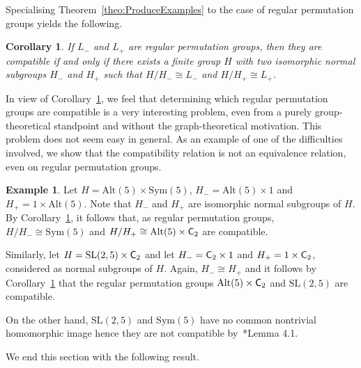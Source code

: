 \documentclass[twoside,12pt,leqno]{amsproc}
\numberwithin{table}{section}
\numberwithin{figure}{section}
\theoremstyle{plain}
\newtheorem{corollary}[theorem]{Corollary}
\theoremstyle{definition}\newtheorem{definition}[theorem]{Definition}
\theoremstyle{definition}\newtheorem{example}[theorem]{Example}
\theoremstyle{definition}\newtheorem{construction}[theorem]{Construction}
\theoremstyle{definition}\newtheorem{remark}[theorem]{Remark}
\theoremstyle{definition}\newtheorem{problem}[theorem]{Problem}
\begin{document}
Specialising Theorem~\ref{theo:ProduceExamples} to the case of regular permutation groups yields the following.

\begin{corollary}\label{cor:ProduceExamples2}
If $L_-$ and $L_+$ are regular permutation groups, then they are compatible if and only if there exists a finite group $H$ with two isomorphic normal subgroups $H_-$ and $H_+$ such that $H/H_-\cong L_-$ and $H/H_+\cong L_+$.
\end{corollary}

In view of Corollary~\ref{cor:ProduceExamples2}, we feel that determining  which regular permutation groups are compatible is a very interesting problem, even from a purely group-theoretical standpoint and without the graph-theoretical motivation. This problem does not seem easy in general. As an example of one of the difficulties involved, we show that the compatibility relation is not an equivalence relation, even on regular permutation groups.

\begin{example}
Let $H={\textrm{Alt}}(5)\times{\mathrm{Sym}}(5)$, $H_-={\textrm{Alt}}(5)\times 1$ and $H_+=1\times{\textrm{Alt}}(5)$. Note that $H_-$ and $H_+$ are isomorphic normal subgroups of $H$. By Corollary~\ref{cor:ProduceExamples2}, it follows that, as regular permutation groups, $H/H_-\cong {\mathrm{Sym}}(5)$ and $H/H_+\cong{\textrm{Alt}}(5)\times{\textup{\textsf{C}}}_2$ are compatible.

Similarly, let $H={\mathrm{SL}}(2,5)\times{\textup{\textsf{C}}}_2$  and let $H_-={\textup{\textsf{C}}}_2\times 1$ and $H_+=1\times{\textup{\textsf{C}}}_2$, considered as normal subgroups of $H$. Again, $H_-\cong H_+$  and it follows by Corollary~\ref{cor:ProduceExamples2} that the regular permutation groups ${\textrm{Alt}}(5)\times{\textup{\textsf{C}}}_2$ and ${\mathrm{SL}}(2,5)$ are compatible.

On the other hand, ${\mathrm{SL}}(2,5)$ and ${\mathrm{Sym}}(5)$ have no common nontrivial homomorphic image hence they are not compatible by~\cite{Quirin}*{Lemma 4.1}.
\end{example}

We end this section with the following result.
\end{document}
